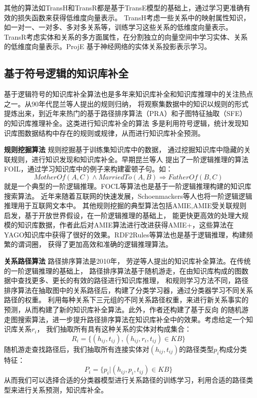 其他的算法如TransH和TransR都是基于TransE模型的基础上，通过学习更准确有效的损失函数来获得低维度向量表示。
TransH考虑一些关系中的映射属性知识，如一对一、一对多、多对多关系等，训练学习这些关系的低维度向量表示。
TransR\cite{Lin2015LearningEA}考虑实体和关系的多方面属性，在分割独立的向量空间中学习实体、关系的低维度向量表示。ProjE\cite{Shi2017ProjEEP}
基于神经网络的实体关系投影表示学习。

\subsection{基于符号逻辑的知识库补全}
\label{cha:symbolic}
基于逻辑符号的知识库补全算法也是多年来知识库补全和知识库推理中的关注热点之一。从90年代昆兰等人提出的规则归纳，
将观察集数据中的知识以规则的形式提炼出来，到近年来热门的基于路径排序算法（PRA）和子图特征抽取（SFE）的知识库推理补全。这类进行知识库补全的算法
多是利用符号逻辑，统计发现知识库图数据结构中存在的规则或规律，从而进行知识库补全预测。

\textbf{规则挖掘算法} 规则挖掘基于训练集知识库中的数据，
通过挖掘知识库中隐藏的关联规则，进行知识发现和知识库补全。早期昆兰等人
提出了一阶逻辑推理的算法FOIL\cite{Quinlan1993FOILAM}，通过学习知识库中的例子来构建霍顿子句。如：
$$MotherOf(A,C)\land MarriedTo(A,B)\Rightarrow FatherOf(B,C)$$
就是一个典型的一阶逻辑推理。FOCL\cite{PAZZANI1991DetectingAC}等算法也是基于一阶逻辑推理构建的知识库搜索算法。
近年来随着互联网的快速发展，Schoenmackers\cite{Schoenmackers:2010}等人也将一阶逻辑逻辑推理用于互联网文本中。
其他规则挖掘的典型算法包括AMIE\cite{Galarraga2013},AMIE受关联规则启发，基于开放世界假设，在一阶逻辑推理的基础上，
能更快更高效的处理大规模的知识库数据，作者此后对AMIE算法进行改进获得AMIE+\cite{Galrraga2015FastRM}，这些算法在
YAGO知识库中获得了很好的效果。RDF2Rules\cite{Wang2015RDF2RulesLR}等算法也是基于逻辑推理，构建频繁的谓词圈，
获得了更加高效和准确的逻辑推理算法。

\textbf{关系路径算法} 路径排序算法\cite{Lao2010}是2010年，
劳逆等人提出的知识库补全算法。在传统的一阶逻辑推理的基础上，
路径排序算法基于随机游走，在由知识库构成的图数据中查找更多、更长的有效的路径进行知识库推理，
和规则学习方法不同，路径排序算法在抽取图中的关系路径后，构建了分类学习器，通过分类器学习不同关系路径的权重。
利用每种关系下三元组的不同关系路径权重，来进行新关系事实的预测，从而构建了新的知识库补全算法。此外，作者还构建了基于反向
的随机游走图搜索算法\cite{Lao2015LearningRF}，进一步提升路径排序算法在知识库补全中的效果。考虑给定一个知识库关系$r_i$，
我们抽取所有具有这种关系的实体对构成集合：
$$R_i=\{{(h_{ij},t_{ij}),(h_{ij},r_i,t_{ij})\in KB}\}$$
随机游走查找路径后，我们抽取所有连接实体对$(h_{ij},t_{ij})$的路径类型$p_i$构成分类特征：
$$P_i=\{{p_i|(h_{ij},p_i,t_{ij})\in KB}\}$$
从而我们可以选择合适的分类器模型进行关系路径的训练学习，利用合适的路径类型来进行关系预测，知识库补全。


